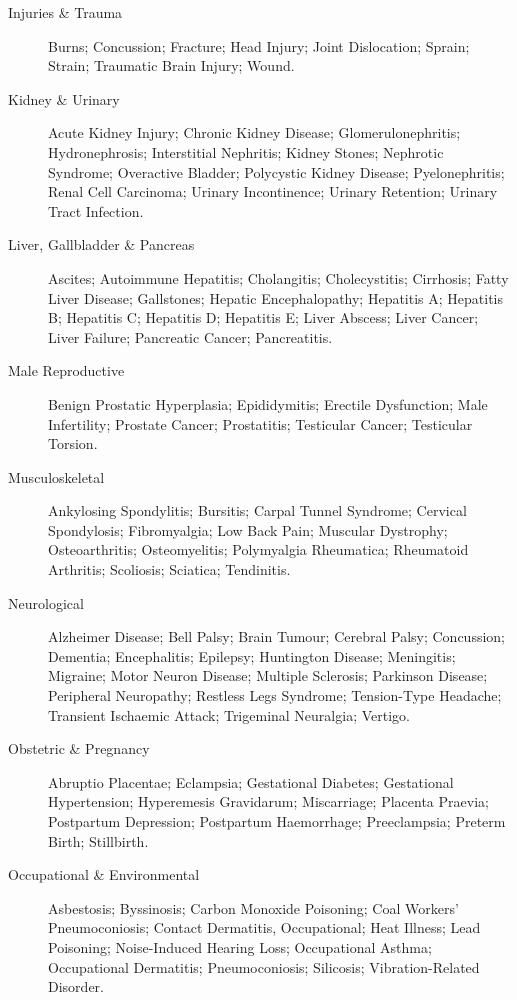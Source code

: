 \begin{description}
\item[Injuries \& Trauma] Burns; Concussion; Fracture; Head Injury; Joint Dislocation; Sprain; Strain; Traumatic Brain Injury; Wound.

\item[Kidney \& Urinary] Acute Kidney Injury; Chronic Kidney Disease; Glomerulonephritis; Hydronephrosis; Interstitial Nephritis; Kidney Stones; Nephrotic Syndrome; Overactive Bladder; Polycystic Kidney Disease; Pyelonephritis; Renal Cell Carcinoma; Urinary Incontinence; Urinary Retention; Urinary Tract Infection.

\item[Liver, Gallbladder \& Pancreas] Ascites; Autoimmune Hepatitis; Cholangitis; Cholecystitis; Cirrhosis; Fatty Liver Disease; Gallstones; Hepatic Encephalopathy; Hepatitis A; Hepatitis B; Hepatitis C; Hepatitis D; Hepatitis E; Liver Abscess; Liver Cancer; Liver Failure; Pancreatic Cancer; Pancreatitis.

\item[Male Reproductive] Benign Prostatic Hyperplasia; Epididymitis; Erectile Dysfunction; Male Infertility; Prostate Cancer; Prostatitis; Testicular Cancer; Testicular Torsion.

\item[Musculoskeletal] Ankylosing Spondylitis; Bursitis; Carpal Tunnel Syndrome; Cervical Spondylosis; Fibromyalgia; Low Back Pain; Muscular Dystrophy; Osteoarthritis; Osteomyelitis; Polymyalgia Rheumatica; Rheumatoid Arthritis; Scoliosis; Sciatica; Tendinitis.

\item[Neurological] Alzheimer Disease; Bell Palsy; Brain Tumour; Cerebral Palsy; Concussion; Dementia; Encephalitis; Epilepsy; Huntington Disease; Meningitis; Migraine; Motor Neuron Disease; Multiple Sclerosis; Parkinson Disease; Peripheral Neuropathy; Restless Legs Syndrome; Tension-Type Headache; Transient Ischaemic Attack; Trigeminal Neuralgia; Vertigo.

\item[Obstetric \& Pregnancy] Abruptio Placentae; Eclampsia; Gestational Diabetes; Gestational Hypertension; Hyperemesis Gravidarum; Miscarriage; Placenta Praevia; Postpartum Depression; Postpartum Haemorrhage; Preeclampsia; Preterm Birth; Stillbirth.

\item[Occupational \& Environmental] Asbestosis; Byssinosis; Carbon Monoxide Poisoning; Coal Workers' Pneumoconiosis; Contact Dermatitis, Occupational; Heat Illness; Lead Poisoning; Noise-Induced Hearing Loss; Occupational Asthma; Occupational Dermatitis; Pneumoconiosis; Silicosis; Vibration-Related Disorder.


\end{description}
